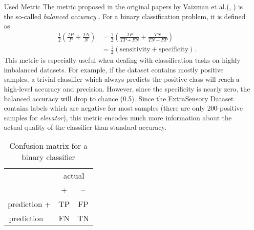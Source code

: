 \begin{subsection}{Used Metric}
		The metric proposed in the original papers by Vaizman et al.(\cite{Vaizman17}, \cite{Vaizman18}) is the so-called \emph{balanced accuracy} \cite{brodersen2010balanced}. For a binary classification problem, it is defined as
		\begin{equation}
			\begin{split}
				\frac{1}{2} \left(\frac{TP}{P} + \frac{TN}{N}\right) & = \frac{1}{2} \left(\frac{TP}{TP + FN} + \frac{TN}{TN + FP}\right)\\
				& = \frac{1}{2} \left(\text{sensitivity} + \text{specificity}\right).
			\end{split}
		\end{equation}
		This metric is especially useful when dealing with classification tasks on highly imbalanced datasets. For example, if the dataset contains mostly positive samples, a trivial classifier which always predicts the positive class will reach a high-level accuracy and precision. However, since the specificity is nearly zero, the balanced accuracy will drop to chance (0.5). Since the ExtraSensory Dataset contains labels which are negative for most samples (there are only 200 positive samples for \emph{elevator}), this metric encodes much more information about the actual quality of the classifier than standard accuracy.
		\begin{table}[H]
			\begin{center} 
				\caption{Confusion matrix for a binary classifier}
				\begin{tabular}{c|c|c|}
					& \multicolumn{2}{c|}{actual} \\
					& +& -- \\
					\midrule
					prediction + & TP & FP \\
					\midrule
					prediction -- & FN & TN \\
					\bottomrule
				\end{tabular}
			\end{center}		
		\end{table}

\end{subsection}
